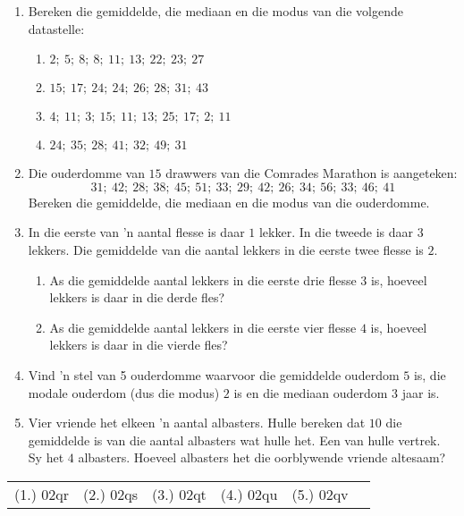 \begin{exercises}{}{
    \begin{enumerate}[noitemsep, label=\textbf{\arabic*}.]

    \item Bereken die gemiddelde, die mediaan en die modus van die volgende datastelle:
      \begin{enumerate}[noitemsep, label=\textbf{(\alph*)} ]
      \item $2;~5;~8;~8;~11;~13;~22;~23;~27$
      \item $15;~17;~24;~24;~26;~28;~31;~43$
      \item $4;~11;~3;~15;~11;~13;~25;~17;~2;~11$
      \item $24;~35;~28;~41;~32;~49;~31$
      \end{enumerate}
    \item Die ouderdomme van $15$ drawwers van die  Comrades Marathon is aangeteken:
      \begin{equation*}
        31;~42;~28;~38;~45;~51;~33;~29;~42;~26;~34;~56;~33;~46;~41
      \end{equation*}
      Bereken die gemiddelde, die mediaan en die modus van die ouderdomme.
    \item In die eerste van ’n aantal flesse is daar $1$ lekker. In die tweede is daar $3$ lekkers. Die gemiddelde van die aantal lekkers in die eerste twee flesse is $2$.
      \begin{enumerate}[noitemsep, label=\textbf{(\alph*)} ]
      \item As die gemiddelde aantal lekkers in die eerste drie flesse $3$ is, hoeveel lekkers is daar in die derde fles?
      \item As die gemiddelde aantal lekkers in die eerste vier flesse $4$ is, hoeveel lekkers is daar in die vierde fles?
      \end{enumerate}
    \item Vind ’n stel van 5 ouderdomme waarvoor die gemiddelde ouderdom $5$ is, die modale ouderdom (dus die modus) $2$ is en die mediaan ouderdom $3$ jaar is.
    \item Vier vriende het elkeen ’n aantal albasters. Hulle bereken dat $10$ die gemiddelde is van die aantal albasters wat hulle het. Een van hulle vertrek. Sy het $4$ albasters. Hoeveel albasters het die oorblywende vriende altesaam?
    \end{enumerate}
\par \practiceinfo
\par \begin{tabular}[h]{cccccc}
(1.)	02qr	&
(2.)	02qs	&
(3.)	02qt	&
(4.)	02qu	&
(5.)	02qv	&
\end{tabular}
}
\end{exercises}

